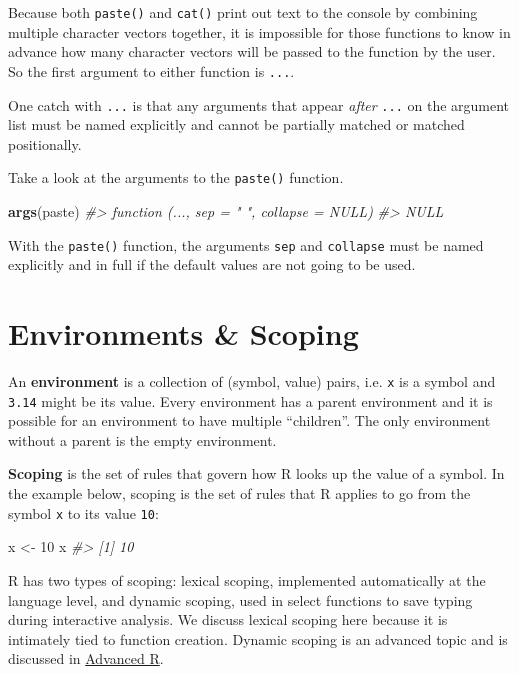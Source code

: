 \documentclass[]{book}
\newenvironment{Shaded}{\begin{snugshade}}{\end{snugshade}}
\newcommand{\CommentTok}[1]{\textcolor[rgb]{0.56,0.35,0.01}{\textit{#1}}}
\newcommand{\DecValTok}[1]{\textcolor[rgb]{0.00,0.00,0.81}{#1}}
\newcommand{\KeywordTok}[1]{\textcolor[rgb]{0.13,0.29,0.53}{\textbf{#1}}}
\newcommand{\NormalTok}[1]{#1}
\newcommand{\StringTok}[1]{\textcolor[rgb]{0.31,0.60,0.02}{#1}}
\theoremstyle{definition}
\theoremstyle{definition}
\theoremstyle{definition}
\theoremstyle{remark}
\begin{document}
Because both \texttt{paste()} and \texttt{cat()} print out text to the
console by combining multiple character vectors together, it is
impossible for those functions to know in advance how many character
vectors will be passed to the function by the user. So the first
argument to either function is \texttt{...}.

One catch with \texttt{...} is that any arguments that appear
\emph{after} \texttt{...} on the argument list must be named explicitly
and cannot be partially matched or matched positionally.

Take a look at the arguments to the \texttt{paste()} function.

\begin{Shaded}
\begin{Highlighting}[]
\KeywordTok{args}\NormalTok{(paste)}
\CommentTok{#> function (..., sep = " ", collapse = NULL) }
\CommentTok{#> NULL}
\end{Highlighting}
\end{Shaded}

With the \texttt{paste()} function, the arguments \texttt{sep} and
\texttt{collapse} must be named explicitly and in full if the default
values are not going to be used.

\hypertarget{environments-scoping}{%
\section{Environments \& Scoping}\label{environments-scoping}}

An \textbf{environment} is a collection of (symbol, value) pairs, i.e.
\texttt{x} is a symbol and \texttt{3.14} might be its value. Every
environment has a parent environment and it is possible for an
environment to have multiple ``children''. The only environment without
a parent is the empty environment.

\textbf{Scoping} is the set of rules that govern how R looks up the
value of a symbol. In the example below, scoping is the set of rules
that R applies to go from the symbol \texttt{x} to its value
\texttt{10}:

\begin{Shaded}
\begin{Highlighting}[]
\NormalTok{x <-}\StringTok{ }\DecValTok{10}
\NormalTok{x}
\CommentTok{#> [1] 10}
\end{Highlighting}
\end{Shaded}

R has two types of scoping: lexical scoping, implemented automatically
at the language level, and dynamic scoping, used in select functions to
save typing during interactive analysis. We discuss lexical scoping here
because it is intimately tied to function creation. Dynamic scoping is
an advanced topic and is discussed in
\href{http://adv-r.had.co.nz}{Advanced R}.
\end{document}
